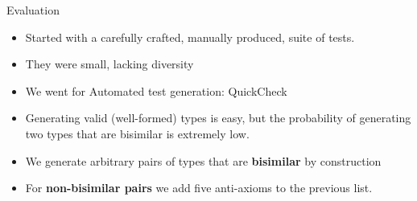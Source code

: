 \documentclass[10pt]{beamer}
\begin{document}

\begin{frame}{Evaluation}
  \begin{itemize}
  \item Started with a carefully crafted, manually produced, suite of tests.
  \item They were small, lacking diversity
  \item We went for Automated test generation: QuickCheck
  \item Generating valid (well-formed) types is easy, but the probability of
    generating two types that are bisimilar is extremely low.
    \smallskip
    \smallskip
  \item We generate arbitrary pairs of types that are \textbf{bisimilar}
    by construction %
  \item For \textbf{non-bisimilar pairs} we add five anti-axioms to the previous list.
  \end{itemize}
     
\end{frame}
\end{document}
